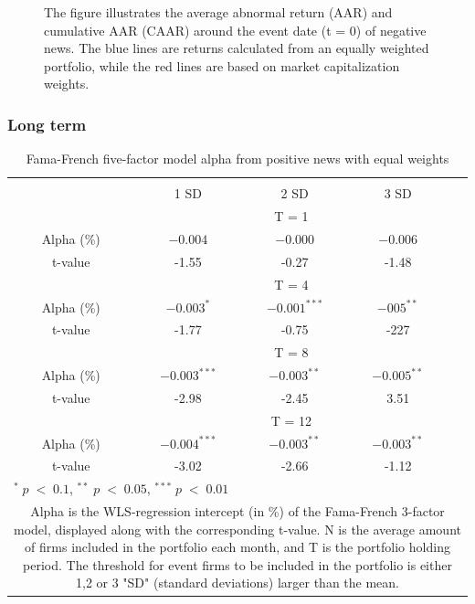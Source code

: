 \begin{figure}
\begin{minipage}[b]{0.49\textwidth}
    \label{fig:ST_pos_sensitivity_nasdaq}
     \end{minipage}
        \caption*{\footnotesize The figure illustrates the average abnormal return (AAR) and cumulative AAR (CAAR) around the event date (t = 0) of negative news. The blue lines are returns calculated from an equally weighted portfolio, while the red lines are based on market capitalization weights.}
        
        \label{fig:three graphs}
\end{figure}


\subsubsection{Long term}


\setlength{\tabcolsep}{15pt}
\begin{table}[]
\small
\centering
\caption{Fama-French five-factor model alpha from positive news with equal weights} 
\begin{tabular}{ccccccc}
\hline \hline \\ 
 &     &  &    1 SD  &  2 SD  &  3 SD  &  \\ \cline{4-6} 
& & & \multicolumn{3}{c}{ T = 1} & \\ \cline{2-6}
& Alpha (\%)  &  & $ -0.004$  & $-0.000$  & $-0.006$ &  \\
& t-value &  & -1.55 & -0.27  & -1.48 & \\
& & & \multicolumn{3}{c}{ T = 4} & \\ \cline{2-6}
& Alpha (\%)  &  & $ -0.003^{*}$  & $-0.001^{***}$  &  $-005^{**}$ & \\
& t-value & & -1.77  & -0.75 & -227 & \\
& & & \multicolumn{3}{c}{ T = 8} & \\ \cline{2-6}
& Alpha (\%)  &  & $ -0.003^{***}$   & $-0.003^{**}$  & $-0.005^{**}$ &  \\
& t-value &  & -2.98  & -2.45 & 3.51 & \\
&  & & \multicolumn{3}{c}{ T = 12} & \\ \cline{2-6}
& Alpha (\%)  &  & $ -0.004^{***}$  & $-0.003^{**}$  & $-0.003^{**}$ &  \\
& t-value &  & -3.02  & -2.66 & -1.12 & \\
\hline \hline
 \multicolumn{7}{l}{ \footnotesize $^* \; p\; <\; 0.1$, $ ^{**} \; p\; <\; 0.05$, $ ^{***} \; p\; <\; 0.01$  } \\
 \multicolumn{7}{p{11.5cm}}{ \footnotesize Alpha is the WLS-regression intercept (in \%) of the Fama-French 3-factor model, displayed along with the corresponding t-value. N is the average amount of firms included in the portfolio each month, and T is the portfolio holding period. The threshold for event firms to be included in the portfolio is either 1,2 or 3 "SD" (standard deviations) larger than the mean.}  \\ 
\end{tabular}
\label{tab: FF5_pos_equalW}
\end{table}


